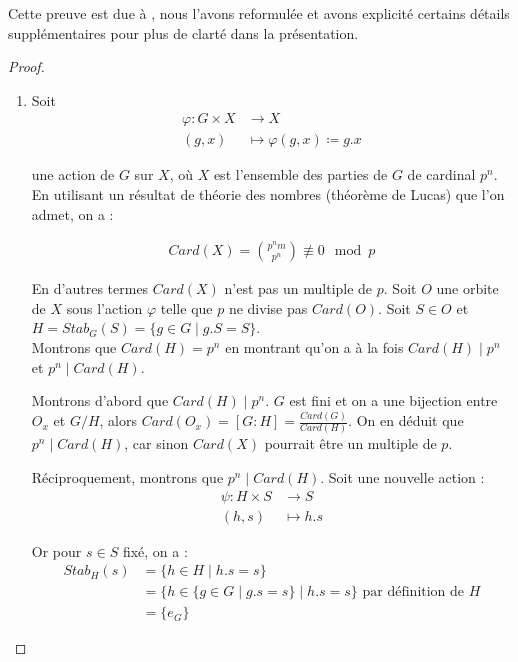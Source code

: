 \documentclass{article}
\theoremstyle{definition}
\theoremstyle{plain}
\theoremstyle{plain}
\theoremstyle{plain}
\theoremstyle{plain}
\theoremstyle{definition}
\theoremstyle{plain}
\theoremstyle{plain}
\begin{document}
\par Cette preuve est due à \cite[p.~216-218]{chen2024napkin}, nous l'avons reformulée et avons explicité certains détails supplémentaires pour plus de clarté dans la présentation.
\begin{proof}
	\begin{enumerate}[label={\upshape(\roman*)}]
		\item 
Soit
\begin{align*}
	\varphi : G \times X &\to X \\
	(g,x) &\mapsto \varphi(g,x) \coloneq g.x
\end{align*}

une action de \( G \) sur \( X \), où \( X \) est l'ensemble des parties de \( G \) de cardinal \( p^{n} \). En utilisant un résultat de théorie des nombres (théorème de Lucas) que l'on admet, on a :

\begin{align*}
	Card(X) = \binom{p^{n}m}{p^{n}} \not\equiv 0 \mod  p 
\end{align*}


En d'autres termes \( Card(X) \) n'est pas un multiple de \( p \).
Soit \( O \) une orbite de \( X \) sous l'action \( \varphi \) telle que \( p \) ne divise pas \( Card(O) \). Soit \( S \in O \) et \( H = Stab_{G}({S}) = \{ g \in G \mid g.S = S \} \). \\
Montrons que \( Card(H) = p^{n} \) en montrant qu'on a à la fois \( Card(H) \mid p^{n} \) et \( p^{n} \mid Card(H) \).

\par Montrons d'abord que \( Card(H) \mid p^{n} \). \( G \) est fini et on a une bijection entre \( O_x \) et \( G/H \), alors \( Card(O_{x}) = [G : H]  = \frac{Card(G)}{Card(H)} \).
On en déduit que \( p^{n} \mid Card(H) \), car sinon \( Card(X) \) pourrait être un multiple de \( p \).

\par Réciproquement, montrons que \( p^{n} \mid Card(H) \). Soit une nouvelle action :
\begin{align*}
	\psi : H \times S &\to S \\
	(h,s) &\mapsto h.s
\end{align*}

Or pour \( s \in S \) fixé, on a :
\begin{align*}
	Stab_{H}({s}) &= \{ h \in H \mid h.s = s \} \\ 
		      &= \{ h \in \{g \in G \mid g.s = s \} \mid h.s = s \} \text{ par définition de } H\\
	&= \{e_{G}\} 
\end{align*}



\end{enumerate}
\end{proof}
\end{document}
